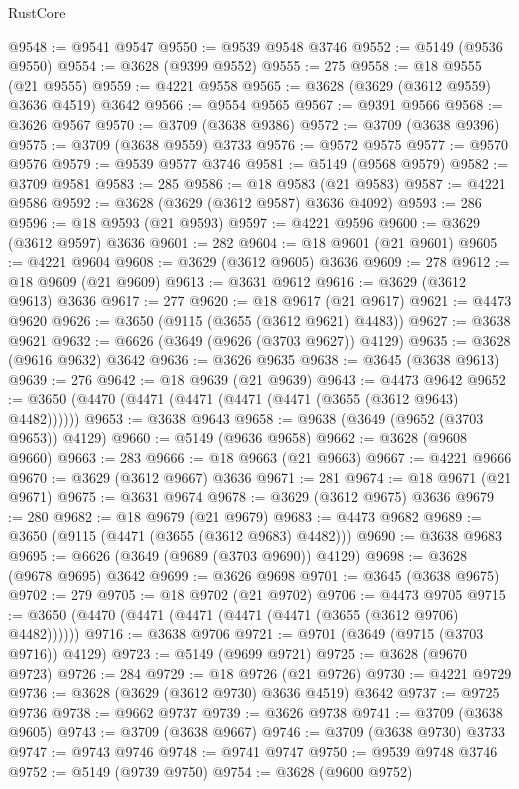 \begin{lexlean}{RustCore}
\begin{coremodule}
@9548 := @9541 @9547
@9550 := @9539 @9548 @3746
@9552 := @5149 (@9536 @9550)
@9554 := @3628 (@9399 @9552)
@9555 := 275
@9558 := @18 @9555 (@21 @9555)
@9559 := @4221 @9558
@9565 := @3628 (@3629 (@3612 @9559) @3636 @4519) @3642
@9566 := @9554 @9565
@9567 := @9391 @9566
@9568 := @3626 @9567
@9570 := @3709 (@3638 @9386)
@9572 := @3709 (@3638 @9396)
@9575 := @3709 (@3638 @9559) @3733
@9576 := @9572 @9575
@9577 := @9570 @9576
@9579 := @9539 @9577 @3746
@9581 := @5149 (@9568 @9579)
@9582 := @3709 @9581
@9583 := 285
@9586 := @18 @9583 (@21 @9583)
@9587 := @4221 @9586
@9592 := @3628 (@3629 (@3612 @9587) @3636 @4092)
@9593 := 286
@9596 := @18 @9593 (@21 @9593)
@9597 := @4221 @9596
@9600 := @3629 (@3612 @9597) @3636
@9601 := 282
@9604 := @18 @9601 (@21 @9601)
@9605 := @4221 @9604
@9608 := @3629 (@3612 @9605) @3636
@9609 := 278
@9612 := @18 @9609 (@21 @9609)
@9613 := @3631 @9612
@9616 := @3629 (@3612 @9613) @3636
@9617 := 277
@9620 := @18 @9617 (@21 @9617)
@9621 := @4473 @9620
@9626 := @3650 (@9115 (@3655 (@3612 @9621) @4483))
@9627 := @3638 @9621
@9632 := @6626 (@3649 (@9626 (@3703 @9627)) @4129)
@9635 := @3628 (@9616 @9632) @3642
@9636 := @3626 @9635
@9638 := @3645 (@3638 @9613)
@9639 := 276
@9642 := @18 @9639 (@21 @9639)
@9643 := @4473 @9642
@9652 := @3650 (@4470 (@4471 (@4471 (@4471 (@4471 (@3655 (@3612 @9643) @4482))))))
@9653 := @3638 @9643
@9658 := @9638 (@3649 (@9652 (@3703 @9653)) @4129)
@9660 := @5149 (@9636 @9658)
@9662 := @3628 (@9608 @9660)
@9663 := 283
@9666 := @18 @9663 (@21 @9663)
@9667 := @4221 @9666
@9670 := @3629 (@3612 @9667) @3636
@9671 := 281
@9674 := @18 @9671 (@21 @9671)
@9675 := @3631 @9674
@9678 := @3629 (@3612 @9675) @3636
@9679 := 280
@9682 := @18 @9679 (@21 @9679)
@9683 := @4473 @9682
@9689 := @3650 (@9115 (@4471 (@3655 (@3612 @9683) @4482)))
@9690 := @3638 @9683
@9695 := @6626 (@3649 (@9689 (@3703 @9690)) @4129)
@9698 := @3628 (@9678 @9695) @3642
@9699 := @3626 @9698
@9701 := @3645 (@3638 @9675)
@9702 := 279
@9705 := @18 @9702 (@21 @9702)
@9706 := @4473 @9705
@9715 := @3650 (@4470 (@4471 (@4471 (@4471 (@4471 (@3655 (@3612 @9706) @4482))))))
@9716 := @3638 @9706
@9721 := @9701 (@3649 (@9715 (@3703 @9716)) @4129)
@9723 := @5149 (@9699 @9721)
@9725 := @3628 (@9670 @9723)
@9726 := 284
@9729 := @18 @9726 (@21 @9726)
@9730 := @4221 @9729
@9736 := @3628 (@3629 (@3612 @9730) @3636 @4519) @3642
@9737 := @9725 @9736
@9738 := @9662 @9737
@9739 := @3626 @9738
@9741 := @3709 (@3638 @9605)
@9743 := @3709 (@3638 @9667)
@9746 := @3709 (@3638 @9730) @3733
@9747 := @9743 @9746
@9748 := @9741 @9747
@9750 := @9539 @9748 @3746
@9752 := @5149 (@9739 @9750)
@9754 := @3628 (@9600 @9752)

\end{coremodule}
\end{lexlean}

